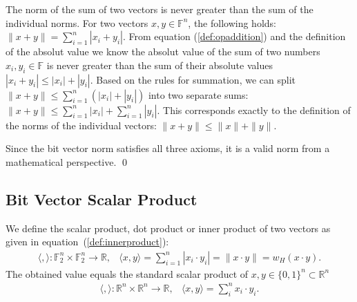 \documentclass[a4paper]{article}
\newcommand{\BF}{\mathbb{F}}
\newcommand{\BR}{\mathbb{R}}
\newcommand{\0}{\mathbf{0}}
\newcommand{\1}{\mathbf{1}}
\begin{document}
\begin{description}
The norm of the sum of two vectors is never greater than the sum of the individual norms.
For two vectors $x, y \in \BF^n$, the following holds: $\|x + y\| = \sum_{i=1}^{n} |x_i + y_i|$.
From equation (\ref{def:opaddition}) and the definition of the absolut value we know the absolut value of the sum of
two numbers $x_i, y_i \in \BF$ is never greater than the sum of their absolute values $|x_i + y_i| \le |x_i| + |y_i|$.
Based on the rules for summation, we can split 
$\|x + y\| \le \sum_{i=1}^{n} (|x_i| + |y_i|)$ into two separate
sums: $\|x + y\| \le \sum_{i=1}^{n} |x_i| + \sum_{i=1}^{n} |y_i|$.
This corresponds exactly to the definition of the norms of the individual vectors: $\|x + y\| \le \|x\| + \|y\|$.
\end{description}
Since the bit vector norm satisfies all three axioms, it is a valid norm from a mathematical perspective.
\qed

\subsection{Bit Vector Scalar Product}
We define the scalar product, dot product \cite{Fischer2020, wikipedia_en_2025_DotProduct} or inner
product of two vectors as given in equation~(\ref{def:innerproduct}):
\begin{equation}
\begin{array}{ll}
\langle , \rangle : \BF_2^n \times \BF_2^n \to \BR, & \langle x , y \rangle =  \sum_{i=1}^n |x_i \cdot y_i| =  \| x \cdot y \| = w_H(x \cdot y).
\end{array}
\label{def:innerproduct}
\end{equation}
The obtained value equals the standard scalar product of $x, y \in \{0, 1\}^n \subset \BR^n$
\begin{equation}
\begin{array}{ll}
\langle , \rangle : \BR^n \times \BR^n \rightarrow \BR, & \langle x , y \rangle  = \sum_i^n x_i \cdot y_i.
\end{array}
\end{equation}
\end{document}
